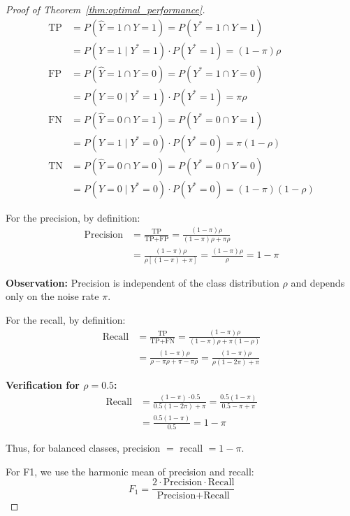 \documentclass[fullpaper]{nldl}
\theoremstyle{plain}
\theoremstyle{definition}
\theoremstyle{remark}
\begin{document}
\begin{proof}[Proof of Theorem~\ref{thm:optimal_performance}]
\begin{align}
\text{TP} &= P(\hat{Y} = 1 \cap Y = 1) = P(Y^* = 1 \cap Y = 1) \nonumber \\
&= P(Y = 1 \mid Y^* = 1) \cdot P(Y^* = 1) = (1-\pi)\rho \\
\text{FP} &= P(\hat{Y} = 1 \cap Y = 0) = P(Y^* = 1 \cap Y = 0) \nonumber \\
&= P(Y = 0 \mid Y^* = 1) \cdot P(Y^* = 1) = \pi\rho \\
\text{FN} &= P(\hat{Y} = 0 \cap Y = 1) = P(Y^* = 0 \cap Y = 1) \nonumber \\
&= P(Y = 1 \mid Y^* = 0) \cdot P(Y^* = 0) = \pi(1-\rho) \\
\text{TN} &= P(\hat{Y} = 0 \cap Y = 0) = P(Y^* = 0 \cap Y = 0) \nonumber \\
&= P(Y = 0 \mid Y^* = 0) \cdot P(Y^* = 0) = (1-\pi)(1-\rho)
\end{align}

For the precision, by definition:
\begin{align}
\text{Precision} &= \frac{\text{TP}}{\text{TP} + \text{FP}} = \frac{(1-\pi)\rho}{(1-\pi)\rho + \pi\rho} \nonumber \\
&= \frac{(1-\pi)\rho}{\rho[(1-\pi) + \pi]} = \frac{(1-\pi)\rho}{\rho} = 1 - \pi
\end{align}

\textbf{Observation:} Precision is independent of the class distribution $\rho$ and depends only on the noise rate $\pi$.

For the recall, by definition:
\begin{align}
\text{Recall} &= \frac{\text{TP}}{\text{TP} + \text{FN}} = \frac{(1-\pi)\rho}{(1-\pi)\rho + \pi(1-\rho)} \nonumber \\
&= \frac{(1-\pi)\rho}{\rho - \pi\rho + \pi - \pi\rho} = \frac{(1-\pi)\rho}{\rho(1-2\pi) + \pi}
\end{align}

\textbf{Verification for $\rho = 0.5$:}
\begin{equation}
\begin{aligned}
\text{Recall}
&= \frac{(1-\pi) \cdot 0.5}{0.5(1-2\pi) + \pi}
 = \frac{0.5(1-\pi)}{0.5 - \pi + \pi} \\
&= \frac{0.5(1-\pi)}{0.5} = 1 - \pi
\end{aligned}
\end{equation}

Thus, for balanced classes, precision $=$ recall $= 1-\pi$.

For F1, we use the harmonic mean of precision and recall:
\begin{equation}
F_1 = \frac{2 \cdot \text{Precision} \cdot \text{Recall}}{\text{Precision} + \text{Recall}}
\end{equation}


\end{proof}
\end{document}
